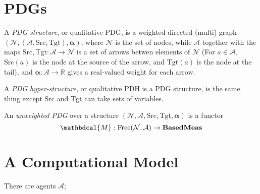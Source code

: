 \documentclass[twoside]{article} %
\theoremstyle{plain}
\theoremstyle{definition}
\newcommand{\BaseMeas}{\mathbf{BasedMeas}}
\newcommand{\N}{\mathcal N}
\newcommand{\Ar}{\mathcal A}
\newcommand{\src}{\mathrm{Src}}
\newcommand{\tgt}{\mathrm{Tgt}}
\newcommand{\balpha}{\boldsymbol\alpha}
\newcommand{\dg}[1]{\mathbdcal{#1}}
\begin{document}
    \section{PDGs}
    \begin{defn}
        A \emph{PDG structure}, or qualitative PDG, is a weighted directed (multi)-graph $(\N, (\Ar, \src, \tgt), \balpha)$, where $\N$ is the set of nodes, while $\Ar$ together with the maps  $\src, \tgt: \Ar \to \N$ is a set of arrows betwen elements of $\N$ (For $a \in \mathcal A$, $\src(a)$ is the node at the source of the arrow, and $\tgt(a)$ is the node at the tail),  and $\balpha : \Ar \to \mathbb R$ gives a real-valued weight for each arrow.
    \end{defn}
    
    A \emph{PDG hyper-structure}, or qualitative PDH is a PDG structure, is the same thing except $\src$ and $\tgt$ can take sets of variables. 
    
    
    \begin{defn}
        An \emph{unweighted PDG} over a structure $(\N, \Ar, \src,\tgt, \balpha)$ is a functor
        \[ 
            {\dg M} : \mathrm{Free}(\N, \Ar) \to  \BaseMeas
        \] 
    \end{defn}    
    
    
    \section{A Computational Model}
    There are agents $\mathcal A$; 
    \begin{center}
        \begin{tikzpicture}
            
        \end{tikzpicture}
    \end{center}
    \]
    
    
\end{document}
